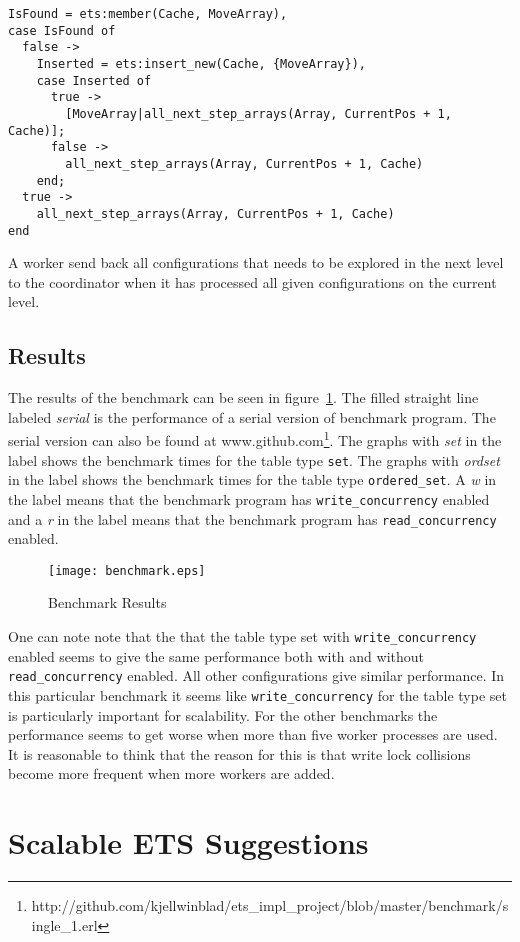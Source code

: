 \documentclass[aps,pre,preprint,nofootinbib]{revtex4}
\begin{document}
    \lstset{language=erlang, caption=Worker code that is interacting with ETS, label=li_erlang_ets_interaction} 
\begin{lstlisting} 
IsFound = ets:member(Cache, MoveArray),
case IsFound of
  false ->
    Inserted = ets:insert_new(Cache, {MoveArray}),
    case Inserted of
      true ->
        [MoveArray|all_next_step_arrays(Array, CurrentPos + 1, Cache)];
      false ->
        all_next_step_arrays(Array, CurrentPos + 1, Cache)
    end;
  true ->
    all_next_step_arrays(Array, CurrentPos + 1, Cache)
end
\end{lstlisting}
    
    A worker send back all configurations that needs to be explored in the next level to the coordinator when it has processed all given configurations on the current level.


\subsection{Results}

  The results of the benchmark can be seen in figure~\ref{fig:benchmark_results}.
  The filled straight line labeled \emph{serial} is the performance of a serial version of benchmark program.
  The serial version can also be found at www.github.com\footnote{http://github.com/kjellwinblad/ets\_impl\_project/blob/master/benchmark/single\_1.erl}.
  The graphs with \emph{set} in the label shows the benchmark times for the table type \verb|set|.
  The graphs with \emph{ordset} in the label shows the benchmark times for the table type \verb|ordered_set|.
  A \emph{w} in the label means that the benchmark program has \verb|write_concurrency| enabled and a \emph{r} in the label means that the benchmark program has \verb|read_concurrency| enabled.
  
  
\begin{figure}[htb]
\centering
\texttt{[image: benchmark.eps]}
\caption{Benchmark Results} 
\label{fig:benchmark_results}
\end{figure}

  One can note note that the that the table type set with \verb|write_concurrency| enabled seems to give the same performance both with and without \verb|read_concurrency| enabled.
  All other configurations give similar performance.
  In this particular benchmark it seems like \verb|write_concurrency| for the table type set is particularly important for scalability.
  For the other benchmarks the performance seems to get worse when more than five worker processes are used.
  It is reasonable to think that the reason for this is that write lock collisions become more frequent when more workers are added.
  
  
  
\section{Scalable ETS Suggestions}

  

\begin{thebibliography}{9}
\end{thebibliography}
\end{document}

